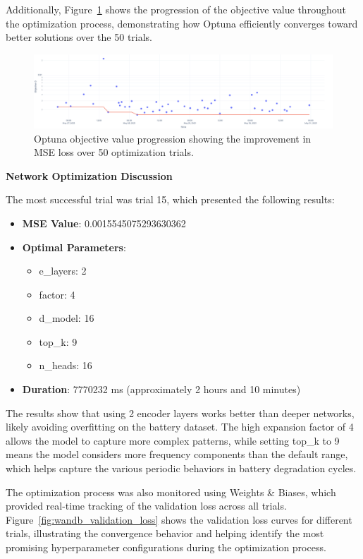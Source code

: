 Additionally, Figure~\ref{fig:optuna_objective} shows the progression of the objective value throughout the optimization process, demonstrating how Optuna efficiently converges toward better solutions over the 50 trials.

\begin{figure}[htbp]
    \centering
    \includegraphics[width=1\textwidth]{imgs/optuna_objective_plot.png}
    \caption{Optuna objective value progression showing the improvement in MSE loss over 50 optimization trials.}
    \label{fig:optuna_objective}
\end{figure}

\textbf{Network Optimization Discussion}
\label{subsec:best_trial_results}

The most successful trial was trial 15, which presented the following results:

\begin{itemize}
    \item \textbf{MSE Value}: 0.0015545075293630362
    \item \textbf{Optimal Parameters}:
    \begin{itemize}
        \item e\_layers: 2
        \item factor: 4  
        \item d\_model: 16
        \item top\_k: 9
        \item n\_heads: 16
    \end{itemize}
    \item \textbf{Duration}: 7770232 ms (approximately 2 hours and 10 minutes)
\end{itemize}

The results show that using 2 encoder layers works better than deeper networks, likely avoiding overfitting on the battery dataset. The high expansion factor of 4 allows the model to capture more complex patterns, while setting top\_k to 9 means the model considers more frequency components than the default range, which helps capture the various periodic behaviors in battery degradation cycles.

The optimization process was also monitored using Weights \& Biases, which provided real-time tracking of the validation loss across all trials. Figure~\ref{fig:wandb_validation_loss} shows the validation loss curves for different trials, illustrating the convergence behavior and helping identify the most promising hyperparameter configurations during the optimization process.


